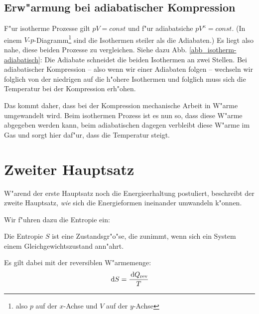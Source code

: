 \subsection{Erw"armung bei adiabatischer Kompression}
\label{kap_erwarmung-bei-adiabatischer-kompression}

F"ur isotherme Prozesse gilt $pV = const$ und f"ur adiabatsiche
$pV^\kappa = const$. (In einem $V$-$p$-Diagramm\footnote{also $p$ auf
  der $x$-Achse und $V$ auf der $y$-Achse} sind die Isothermen steiler
als die Adiabaten.) Es liegt also nahe, diese beiden Prozesse zu
vergleichen. Siehe dazu Abb. \ref{abb_isotherm-adiabatisch}: Die
Adiabate schneidet die beiden Isothermen an zwei Stellen. Bei
adiabatischer Kompression -- also wenn wir einer Adiabaten folgen --
wechseln wir folglich von der niedrigen auf die h"ohere Isothermen und
folglich muss sich die Temperatur bei der Kompression erh"ohen.

Das kommt daher, dass bei der Kompression mechanische Arbeit in W"arme
umgewandelt wird. Beim isothermen Prozess ist es nun so, dass diese
W"arme abgegeben werden kann, beim adiabatischen dagegen verbleibt
diese W"arme im Gas und sorgt hier daf"ur, dass die Temperatur steigt.













\section{Zweiter Hauptsatz}
\label{kap_zweiter-hauptsatz}

W"arend der erste Hauptsatz noch die Energieerhaltung postuliert,
beschreibt der zweite Hauptsatz, \emph{wie} sich die Energieformen
ineinander umwandeln k"onnen.

Wir f"uhren dazu die Entropie ein:

\begin{Def}
Die Entropie $S$ ist eine Zustandsgr"o"se, die zunimmt, wenn sich ein
System einem Gleichgewichtszustand ann"ahrt. 
\end{Def}
Es gilt 
dabei mit der reversiblen W"armemenge:
\begin{equation}
   \label{eqn_def_entropie}
   \, \mathrm{d} S = \frac{\, \mathrm{d} Q_\text{rev}}{T} 
\end{equation}

